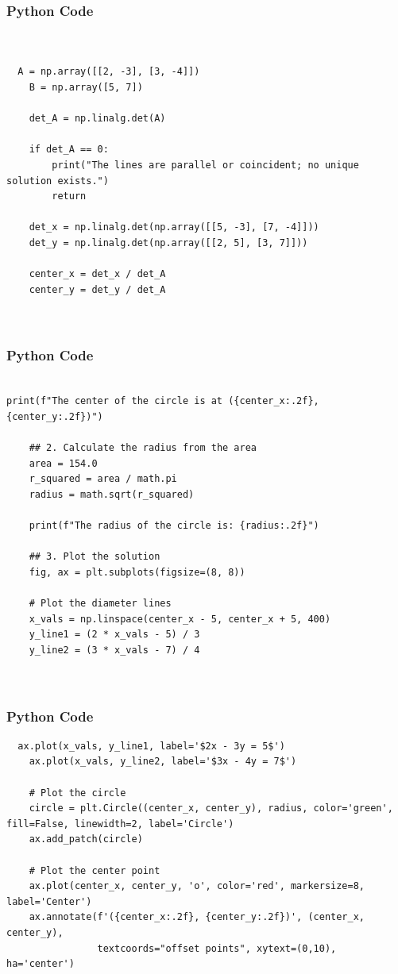 \documentclass{beamer}
\begin{document}
    \begin{frame}[fragile]
    \frametitle{Python Code }
    \begin{lstlisting}


  A = np.array([[2, -3], [3, -4]])
    B = np.array([5, 7])
    
    det_A = np.linalg.det(A)
    
    if det_A == 0:
        print("The lines are parallel or coincident; no unique solution exists.")
        return
        
    det_x = np.linalg.det(np.array([[5, -3], [7, -4]]))
    det_y = np.linalg.det(np.array([[2, 5], [3, 7]]))
    
    center_x = det_x / det_A
    center_y = det_y / det_A
    
    
          \end{lstlisting}
\end{frame} 

\begin{frame}[fragile]
    \frametitle{Python Code }
    \begin{lstlisting}

print(f"The center of the circle is at ({center_x:.2f}, {center_y:.2f})")
    
    ## 2. Calculate the radius from the area
    area = 154.0
    r_squared = area / math.pi
    radius = math.sqrt(r_squared)
    
    print(f"The radius of the circle is: {radius:.2f}")

    ## 3. Plot the solution
    fig, ax = plt.subplots(figsize=(8, 8))
    
    # Plot the diameter lines
    x_vals = np.linspace(center_x - 5, center_x + 5, 400)
    y_line1 = (2 * x_vals - 5) / 3
    y_line2 = (3 * x_vals - 7) / 4
    
  
          \end{lstlisting}
\end{frame} 

\begin{frame}[fragile]
    \frametitle{Python Code }
    \begin{lstlisting}
  ax.plot(x_vals, y_line1, label='$2x - 3y = 5$')
    ax.plot(x_vals, y_line2, label='$3x - 4y = 7$')
    
    # Plot the circle
    circle = plt.Circle((center_x, center_y), radius, color='green', fill=False, linewidth=2, label='Circle')
    ax.add_patch(circle)
    
    # Plot the center point
    ax.plot(center_x, center_y, 'o', color='red', markersize=8, label='Center')
    ax.annotate(f'({center_x:.2f}, {center_y:.2f})', (center_x, center_y),
                textcoords="offset points", xytext=(0,10), ha='center')

  
          \end{lstlisting}
\end{frame} 
\end{document}
